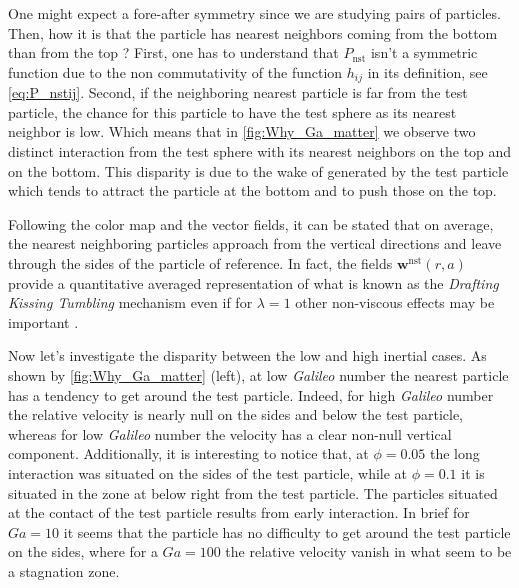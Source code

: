 One might expect a fore-after symmetry since we are studying pairs of particles. 
Then, how it is that the particle has nearest neighbors coming from the bottom than from the top ? 
First, one has to understand that $P_\text{nst}$ isn't a symmetric function due to the non commutativity of the function $h_{ij}$ in its definition, see \ref{eq:P_nstij}. 
Second, if the neighboring nearest particle is far from the test particle, the chance for this particle to have the test sphere as its nearest neighbor is low. 
Which means that in \ref{fig:Why_Ga_matter} we observe two distinct interaction from the test sphere with its nearest neighbors on the top and on the bottom. 
This disparity is due to the wake of generated by the test particle which tends to attract the particle at the bottom and to push those on the top. 

Following the color map and the vector fields, it can be stated that on average, the nearest neighboring particles approach from the vertical directions and leave
through the sides of the particle of reference. 
In fact, the fields $\textbf{w}^\text{nst}(r, a)$ provide a quantitative averaged representation of what is known as the \textit{Drafting Kissing Tumbling}\citep{fortes1987nonlinear} mechanism even if for $\lambda = 1$ other non-viscous effects may be important \citet{legendre2003hydrodynamic}.

Now let's investigate the disparity between the low and high inertial cases. 
As shown by \ref{fig:Why_Ga_matter} (left), at low \textit{Galileo} number the nearest particle has a tendency to get around the test particle.
Indeed, for high \textit{Galileo} number the relative velocity is nearly null on the sides and below the test particle, whereas for low \textit{Galileo} number the velocity has a clear non-null vertical component. 
Additionally, it is interesting to notice that,  at $\phi = 0.05$ the long interaction was situated on the sides of the test particle, while at $\phi = 0.1$ it is situated in the zone at below right from the test particle. 
The particles situated at the contact of the test particle results from early interaction. 
In brief for $Ga = 10$ it seems that the particle has no difficulty to get around the test particle on the sides, where for a $Ga = 100$ the relative velocity vanish in what seem to be a stagnation zone.


